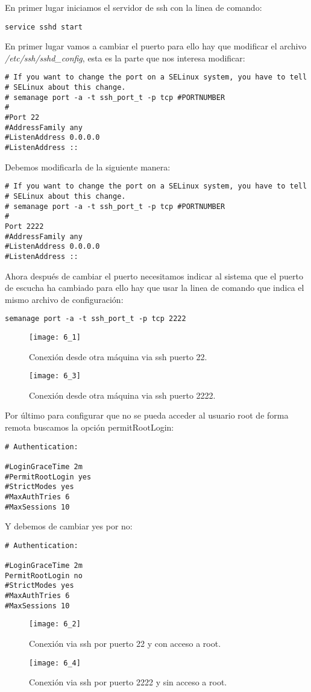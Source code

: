 \documentclass[a4paper, 11pt]{article} %
\begin{document}
En primer lugar iniciamos el servidor de ssh con la linea de comando:
\begin{verbatim}
service sshd start
\end{verbatim}
En primer lugar vamos a cambiar el puerto para ello hay que modificar el archivo \textit{/etc/ssh/sshd\_config}, esta es la parte que nos interesa modificar: 
\begin{verbatim}
# If you want to change the port on a SELinux system, you have to tell
# SELinux about this change.
# semanage port -a -t ssh_port_t -p tcp #PORTNUMBER
#
#Port 22
#AddressFamily any
#ListenAddress 0.0.0.0
#ListenAddress ::
\end{verbatim}
Debemos modificarla de la siguiente manera:
\begin{verbatim}
# If you want to change the port on a SELinux system, you have to tell
# SELinux about this change.
# semanage port -a -t ssh_port_t -p tcp #PORTNUMBER
#
Port 2222
#AddressFamily any
#ListenAddress 0.0.0.0
#ListenAddress ::
\end{verbatim}
Ahora después de cambiar el puerto necesitamos indicar al sistema que el puerto de escucha ha cambiado para ello hay que usar la linea de comando que indica el mismo archivo de configuración:
\begin{verbatim}
semanage port -a -t ssh_port_t -p tcp 2222
\end{verbatim}
\begin{figure}[h]
\centering 
\texttt{[image: 6\_1]} 
\caption{Conexión desde otra máquina via ssh puerto 22.} 
\vspace{-0.5cm}
\label{contexto:figura} 
\end{figure}
\begin{figure}[h]
\centering 
\texttt{[image: 6\_3]} 
\caption{Conexión desde otra máquina via ssh puerto 2222.} 
\vspace{-0.5cm}
\label{contexto:figura} 
\end{figure}
\newpage
Por último para configurar que no se pueda acceder al usuario root de forma remota  buscamos la opción permitRootLogin:
\begin{verbatim}
# Authentication:

#LoginGraceTime 2m
#PermitRootLogin yes
#StrictModes yes
#MaxAuthTries 6
#MaxSessions 10
\end{verbatim}
Y debemos de cambiar yes por no:
\begin{verbatim}
# Authentication:

#LoginGraceTime 2m
PermitRootLogin no
#StrictModes yes
#MaxAuthTries 6
#MaxSessions 10
\end{verbatim}
\begin{figure}[h]
\centering 
\texttt{[image: 6\_2]} 
\caption{Conexión via ssh por puerto 22 y con acceso a root.} 
\vspace{-0.3cm}
\label{contexto:figura} 
\end{figure}
\begin{figure}[h]
\centering 
\texttt{[image: 6\_4]} 
\caption{Conexión via ssh por puerto 2222 y sin acceso a root.} 
\vspace{-0.5cm}
\label{contexto:figura} 
\end{figure}
\end{document}
